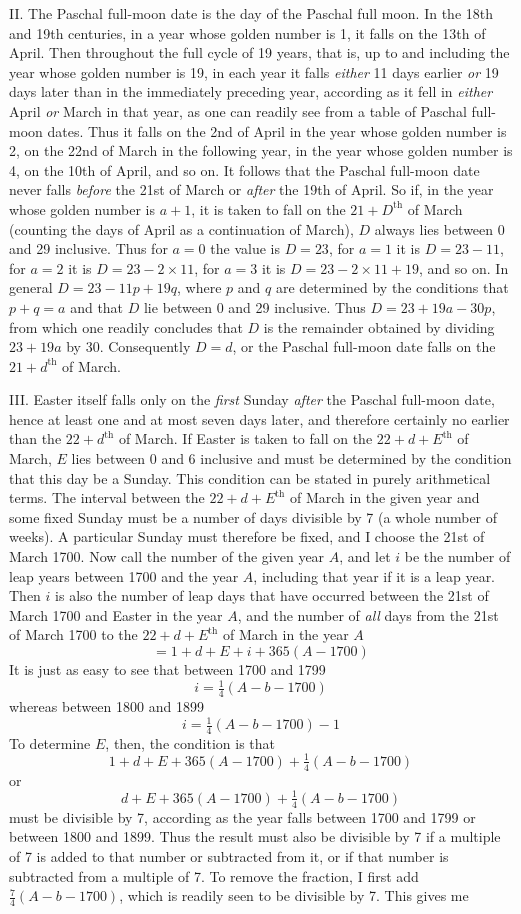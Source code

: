 II. The Paschal full-moon date is the day of the Paschal full moon. In the 18th and 19th centuries, in a year whose golden number is 1, it falls on the 13th of April. Then throughout the full cycle of 19 years, that is, up to and including the year whose golden number is 19, in each year it falls \textit{either} 11 days earlier \textit{or} 19 days later than in the immediately preceding year, according as it fell in \textit{either} April \textit{or} March in that year, as one can readily see from a table of Paschal full-moon dates. Thus it falls on the 2nd of April in the year whose golden number is 2, on the 22nd of March in the following year, in the year whose golden number is 4, on the 10th of April, and so on. It follows that the Paschal full-moon date never falls \textit{before} the 21st of March or \textit{after} the 19th of April. So if, in the year whose golden number is $a+1$, it is taken to fall on the $21+D^{\mathrm{th}}$ of March (counting the days of April as a continuation of March), $D$ always lies between 0 and 29 inclusive. Thus for $a=0$ the value is $D=23$, for $a=1$ it is $D=23-11$, for $a=2$ it is $D=23-2\times11$, for $a=3$ it is $D=23-2\times11+19$, and so on. In general $D=23-11p+19q$, where $p$ and $q$ are determined by the conditions that $p+q=a$ and that $D$ lie between 0 and 29 inclusive. Thus $D=23+19a-30p$, from which one readily concludes that $D$ is the remainder obtained by dividing $23+19a$ by 30. Consequently $D=d$, or the Paschal full-moon date falls on the $21+d^{\mathrm{th}}$ of March.

%
III. Easter itself falls only on the \textit{first} Sunday \textit{after} the Paschal full-moon date, hence at least one and at most seven days later, and therefore certainly no earlier than the $22+d^{\mathrm{th}}$ of March. If Easter is taken to fall on the $22+d+E^{\mathrm{th}}$ of March, $E$ lies between 0 and 6 inclusive and must be determined by the condition that this day be a Sunday. This condition can be stated in purely arithmetical terms. The interval between the $22+d+E^{\mathrm{th}}$ of March in the given year and some fixed Sunday must be a number of days divisible by 7 (a whole number of weeks). A particular Sunday must therefore be fixed, and I choose the 21st of March 1700. Now call the number of the given year $A$, and let $i$ be the number of leap years between 1700 and the year $A$, including that year if it is a leap year. Then $i$ is also the number of leap days that have occurred between the 21st of March 1700 and Easter in the year $A$, and the number of \textit{all} days from the 21st of March 1700 to the $22+d+E^{\mathrm{th}}$ of March in the year $A$
\[
=1+d+E+i+365(A-1700)
\]
It is just as easy to see that between 1700 and 1799
\[
i=\tfrac14(A-b-1700)
\]
whereas between 1800 and 1899
\[
i=\tfrac14(A-b-1700)-1
\]
To determine $E$, then, the condition is that
\[
1+d+E+365(A-1700)+\tfrac14(A-b-1700)
\]
or
\[
d+E+365(A-1700)+\tfrac14(A-b-1700)
\]
must be divisible by 7, according as the year falls between 1700 and 1799 or between 1800 and 1899. Thus the result must also be divisible by 7 if a multiple of 7 is added to that number or subtracted from it, or if that number is subtracted from a multiple of 7. To remove the fraction, I first add $\frac74(A-b-1700)$, which is readily seen to be divisible by 7. This gives me
